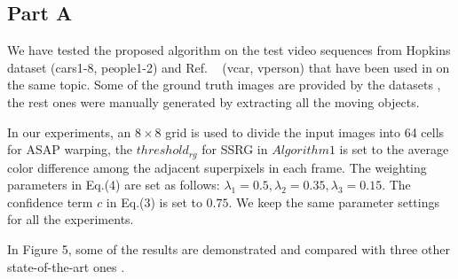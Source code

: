  \subsection{Part A}
We have tested the proposed algorithm on the test video sequences from Hopkins dataset \cite{HopKinsDataSet} (cars1-8, people1-2) and Ref. ~ (vcar, vperson) that have been used in \cite{iccv2009,LimPRFloating,Multitransform,kwak2011Generalized} on the same topic. Some of the ground truth images are provided by the datasets \cite{HopKinsDataSet}, the rest ones were manually generated by extracting all the moving objects. \par
In our experiments, an $8\times8$ grid is used to divide the input images into 64 cells for ASAP warping, the $threshold_{rg}$ for SSRG in $Algorithm 1$ is set to the average color difference among the adjacent superpixels in each frame. The weighting parameters in Eq.(4) are set as follows: $\lambda_{1} = 0.5, \lambda_{2} = 0.35, \lambda_{3} = 0.15$. The confidence term $c$ in Eq.(3) is set to $0.75$. We keep the same parameter settings for all the experiments. \par
In Figure 5, some of the results are demonstrated and compared with three other state-of-the-art ones \cite{kwak2011Generalized,Multitransform,5.8s}.
